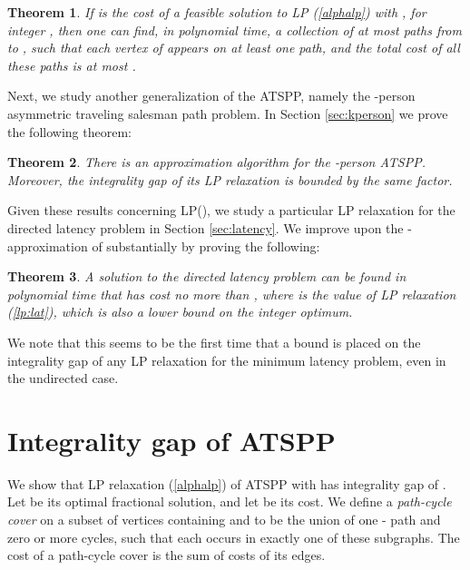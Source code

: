 \documentclass[11pt]{article}
\newtheorem{theorem}{Theorem}[section]
\begin{document}
\begin{theorem}\label{thm:kpath}
If  is the cost of a feasible solution to 
LP (\ref{alphalp}) with
, for integer , then one can find, in polynomial time,
a collection of at most  paths from  to , such 
that each vertex of  appears on at least one path,
and the total cost of all these paths is at most .
\end{theorem}

Next, we study another generalization of the ATSPP, namely the -person asymmetric traveling salesman path problem. In Section \ref{sec:kperson} we prove the following theorem:

\begin{theorem}\label{thm:kperson}
There is an  approximation algorithm for the -person ATSPP. 
Moreover, the integrality gap of its LP relaxation is bounded by the same factor.
\end{theorem}

Given these results concerning LP(), we study a particular
LP relaxation for the directed latency problem in Section \ref{sec:latency}.
We improve upon the -approximation of \cite{nagarajan:ravi:latency} substantially by proving the following:

\begin{theorem} \label{thm:lat}
A solution to the directed latency problem can be found in polynomial time
that has cost no more than , where  is the value 
of LP relaxation (\ref{lp:lat}), which is also a lower bound on the integer optimum.
\end{theorem}

We note that this seems to be the first time that 
a bound is placed on the integrality gap of any LP relaxation for the minimum latency problem, even in the undirected case.


\section{Integrality gap of ATSPP} \label{sec:atspp-ig}

We show that LP relaxation (\ref{alphalp}) of ATSPP with  has integrality gap of .
Let  be its optimal fractional solution, and let  be its cost.
We define a \emph{path-cycle cover} on a subset of vertices  containing  and  to be the union of one - path and zero or more cycles, such that each  occurs in exactly one of these subgraphs. The cost of a path-cycle cover is the sum of costs of its edges.
\end{document}
